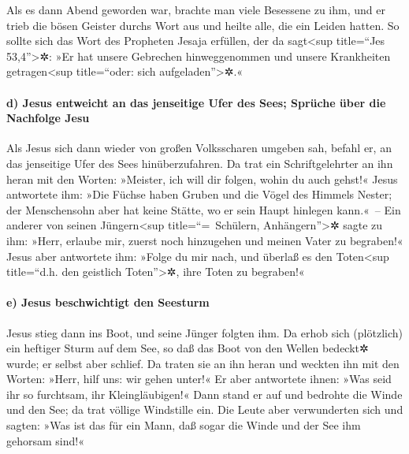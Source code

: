  Als es dann Abend geworden war, brachte man viele
Besessene zu ihm, und er trieb die bösen Geister durchs Wort aus und
heilte alle, die ein Leiden hatten.  So sollte sich das
Wort des Propheten Jesaja erfüllen, der da sagt\textless sup title=``Jes
53,4''\textgreater✲: »Er hat unsere Gebrechen hinweggenommen und unsere
Krankheiten getragen\textless sup title=``oder: sich
aufgeladen''\textgreater✲.«

\hypertarget{d-jesus-entweicht-an-das-jenseitige-ufer-des-sees-spruxfcche-uxfcber-die-nachfolge-jesu}{%
\paragraph{d) Jesus entweicht an das jenseitige Ufer des Sees; Sprüche
über die Nachfolge
Jesu}\label{d-jesus-entweicht-an-das-jenseitige-ufer-des-sees-spruxfcche-uxfcber-die-nachfolge-jesu}}

 Als Jesus sich dann wieder von großen Volksscharen
umgeben sah, befahl er, an das jenseitige Ufer des Sees hinüberzufahren.
 Da trat ein Schriftgelehrter an ihn heran mit den
Worten: »Meister, ich will dir folgen, wohin du auch gehst!«
 Jesus antwortete ihm: »Die Füchse haben Gruben und die
Vögel des Himmels Nester; der Menschensohn aber hat keine Stätte, wo er
sein Haupt hinlegen kann.«~--  Ein anderer von seinen
Jüngern\textless sup title=``=~Schülern, Anhängern''\textgreater✲ sagte
zu ihm: »Herr, erlaube mir, zuerst noch hinzugehen und meinen Vater zu
begraben!«  Jesus aber antwortete ihm: »Folge du mir
nach, und überlaß es den Toten\textless sup title=``d.h. den geistlich
Toten''\textgreater✲, ihre Toten zu begraben!«

\hypertarget{e-jesus-beschwichtigt-den-seesturm}{%
\paragraph{e) Jesus beschwichtigt den
Seesturm}\label{e-jesus-beschwichtigt-den-seesturm}}

 Jesus stieg dann ins Boot, und seine Jünger folgten ihm.
 Da erhob sich (plötzlich) ein heftiger Sturm auf dem
See, so daß das Boot von den Wellen bedeckt✲ wurde; er selbst aber
schlief.  Da traten sie an ihn heran und weckten ihn mit
den Worten: »Herr, hilf uns: wir gehen unter!«  Er aber
antwortete ihnen: »Was seid ihr so furchtsam, ihr Kleingläubigen!« Dann
stand er auf und bedrohte die Winde und den See; da trat völlige
Windstille ein.  Die Leute aber verwunderten sich und
sagten: »Was ist das für ein Mann, daß sogar die Winde und der See ihm
gehorsam sind!«

